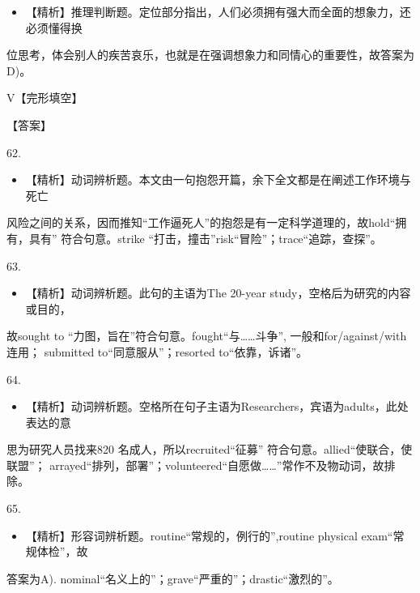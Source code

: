 \documentclass[UTF8,11pt]{ctexart}
\begin{document}
\begin{itemize}[leftmargin=2em,itemsep=.2em,topsep=.4em]\item[D.] 【精析】推理判断题。定位部分指出，人们必须拥有强大而全面的想象力，还必须懂得换
\end{itemize}

位思考，体会别人的疾苦哀乐，也就是在强调想象力和同情心的重要性，故答案为D)。


V【完形填空】


【答案】


62.


\begin{itemize}[leftmargin=2em,itemsep=.2em,topsep=.4em]\item[A.] 【精析】动词辨析题。本文由一句抱怨开篇，余下全文都是在阐述工作环境与死亡
\end{itemize}

风险之间的关系，因而推知“工作逼死人”的抱怨是有一定科学道理的，故hold“拥有，具有” 符合句意。strike “打击，撞击”risk“冒险”；trace“追踪，查探”。


63.


\begin{itemize}[leftmargin=2em,itemsep=.2em,topsep=.4em]\item[C.] 【精析】动词辨析题。此句的主语为The 20-year study，空格后为研究的内容或目的，
\end{itemize}

故sought to “力图，旨在”符合句意。fought“与……斗争”, 一般和for/against/with 连用； submitted to“同意服从”；resorted to“依靠，诉诸”。


64.


\begin{itemize}[leftmargin=2em,itemsep=.2em,topsep=.4em]\item[D.] 【精析】动词辨析题。空格所在句子主语为Researchers，宾语为adults，此处表达的意
\end{itemize}

思为研究人员找来820 名成人，所以recruited“征募” 符合句意。allied“使联合，使联盟”； arrayed“排列，部署”；volunteered“自愿做……”常作不及物动词，故排除。


65.


\begin{itemize}[leftmargin=2em,itemsep=.2em,topsep=.4em]\item[A.] 【精析】形容词辨析题。routine“常规的，例行的”,routine physical exam“常规体检”，故
\end{itemize}

答案为A). nominal“名义上的”；grave“严重的”；drastic“激烈的”。
\end{document}
